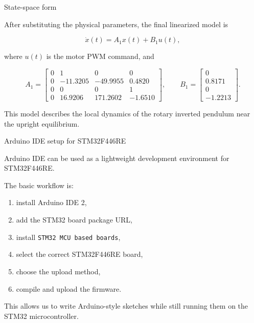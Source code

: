 \documentclass[aspectratio=169]{beamer}
\begin{document}
\begin{frame}{State-space form}

After substituting the physical parameters, the final linearized model is

\[
\dot{x}(t)=A_1x(t)+B_1u(t),
\]

where \(u(t)\) is the motor PWM command, and

\[
A_1=
\begin{bmatrix}
0 & 1 & 0 & 0 \\
0 & -11.3205 & -49.9955 & 0.4820 \\
0 & 0 & 0 & 1 \\
0 & 16.9206 & 171.2602 & -1.6510
\end{bmatrix},
\qquad
B_1=
\begin{bmatrix}
0 \\
0.8171 \\
0 \\
-1.2213
\end{bmatrix}.
\]

\vspace{0.2cm}

This model describes the local dynamics of the rotary inverted pendulum near the upright equilibrium.

\end{frame} 

\begin{frame}{Arduino IDE setup for STM32F446RE}

Arduino IDE can be used as a lightweight development environment for STM32F446RE.

\vspace{0.2cm}

The basic workflow is:

\begin{enumerate}
    \item install Arduino IDE 2,
    \item add the STM32 board package URL,
    \item install \texttt{STM32 MCU based boards},
    \item select the correct STM32F446RE board,
    \item choose the upload method,
    \item compile and upload the firmware.
\end{enumerate}

\vspace{0.2cm}

This allows us to write Arduino-style sketches while still running them on the STM32 microcontroller.

\end{frame}
\end{document}
